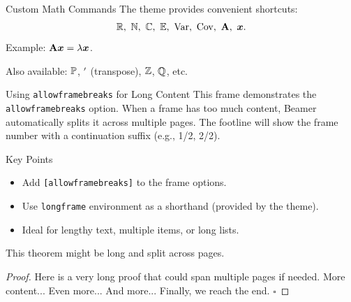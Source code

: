 \documentclass[aspectratio=43]{beamer}
\begin{document}
\begin{frame}{Custom Math Commands}
The theme provides convenient shortcuts:
\[
\R,\ \N,\ \C,\ \E,\ \Var,\ \Cov,\ \mat{A},\ \vct{x}.
\]
Example: $\mathbf{A}\boldsymbol{x} = \lambda \boldsymbol{x}$.

Also available: $\mathbb{P}$, $^{\prime}$ (transpose), $\mathbb{Z}$, $\mathbb{Q}$, etc.

\end{frame}

\begin{frame}[allowframebreaks]{Using \texttt{allowframebreaks} for Long Content}
    This frame demonstrates the \texttt{allowframebreaks} option. When a frame has too much content, Beamer automatically splits it across multiple pages. The footline will show the frame number with a continuation suffix (e.g., 1/2, 2/2).

    \begin{exampleblock}{Key Points}
        \begin{itemize}
            \item Add \texttt{[allowframebreaks]} to the frame options.
            \item Use \texttt{longframe} environment as a shorthand (provided by the theme).
            \item Ideal for lengthy text, multiple items, or long lists.
        \end{itemize}
    \end{exampleblock}

    \begin{theorem}
        This theorem might be long and split across pages.
    \end{theorem}
    \begin{proof}
        Here is a very long proof that could span multiple pages if needed. \pause
        More content... \pause
        Even more... \pause
        And more... \pause
        Finally, we reach the end. \hfill $\square$
    \end{proof}


\end{frame}
\end{document}
